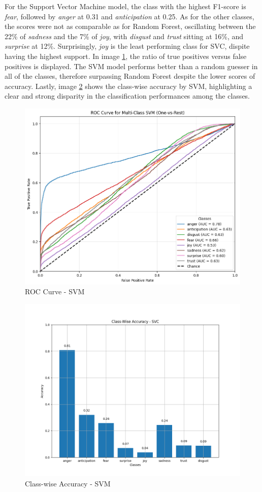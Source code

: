 
For the Support Vector Machine model, the class with the highest F1-score is \textit{fear}, followed by \textit{anger} at 0.31 and \textit{anticipation} at 0.25. 
As for the other classes, the scores were not as comparable as for Random Forest, oscillating between the 22\% of \textit{sadness} and the 7\% of \textit{joy}, with \textit{disgust} and \textit{trust} sitting at 16\%, and \textit{surprise} at 12\%. 
Surprisingly, \textit{joy} is the least performing class for SVC, dispite having the highest support.   
In image \ref{fig:roc_svm}, the ratio of true positives versus false positives is displayed. 
The SVM model performs better than a random guesser in all of the classes, therefore surpassing Random Forest despite the lower scores of accuracy. 
Lastly, image \ref{fig:cwa_svm} shows the class-wise accuracy by SVM, highlighting a clear and strong disparity in the classification performances among the classes.
\begin{figure}[H]
    \centering
    \includegraphics[width=0.5\linewidth]{pictures/roc_svc.png}
    \caption{ROC Curve - SVM}
    \label{fig:roc_svm}
\end{figure}
\begin{figure}[H]
    \centering
    \includegraphics[width=0.5\linewidth]{pictures/class_accuracy_SVC.png}
    \caption{Class-wise Accuracy - SVM}
    \label{fig:cwa_svm}
\end{figure}

